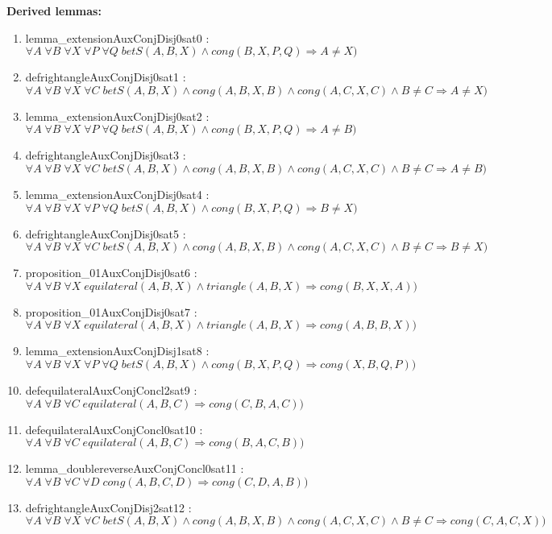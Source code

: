 \documentclass{article}
\begin{document}
\noindent 
{\bfseries Derived lemmas:} 
\begin{enumerate}
\item lemma\_extensionAuxConjDisj0sat0 : $\forall A\;\forall B\;\forall X\;\forall P\;\forall Q\;betS(A, B, X)\wedge cong(B, X, P, Q) \Rightarrow A \neq X)$
\item defrightangleAuxConjDisj0sat1 : $\forall A\;\forall B\;\forall X\;\forall C\;betS(A, B, X)\wedge cong(A, B, X, B)\wedge cong(A, C, X, C)\wedge B \neq C \Rightarrow A \neq X)$
\item lemma\_extensionAuxConjDisj0sat2 : $\forall A\;\forall B\;\forall X\;\forall P\;\forall Q\;betS(A, B, X)\wedge cong(B, X, P, Q) \Rightarrow A \neq B)$
\item defrightangleAuxConjDisj0sat3 : $\forall A\;\forall B\;\forall X\;\forall C\;betS(A, B, X)\wedge cong(A, B, X, B)\wedge cong(A, C, X, C)\wedge B \neq C \Rightarrow A \neq B)$
\item lemma\_extensionAuxConjDisj0sat4 : $\forall A\;\forall B\;\forall X\;\forall P\;\forall Q\;betS(A, B, X)\wedge cong(B, X, P, Q) \Rightarrow B \neq X)$
\item defrightangleAuxConjDisj0sat5 : $\forall A\;\forall B\;\forall X\;\forall C\;betS(A, B, X)\wedge cong(A, B, X, B)\wedge cong(A, C, X, C)\wedge B \neq C \Rightarrow B \neq X)$
\item proposition\_01AuxConjDisj0sat6 : $\forall A\;\forall B\;\forall X\;equilateral(A, B, X)\wedge triangle(A, B, X) \Rightarrow cong(B, X, X, A))$
\item proposition\_01AuxConjDisj0sat7 : $\forall A\;\forall B\;\forall X\;equilateral(A, B, X)\wedge triangle(A, B, X) \Rightarrow cong(A, B, B, X))$
\item lemma\_extensionAuxConjDisj1sat8 : $\forall A\;\forall B\;\forall X\;\forall P\;\forall Q\;betS(A, B, X)\wedge cong(B, X, P, Q) \Rightarrow cong(X, B, Q, P))$
\item defequilateralAuxConjConcl2sat9 : $\forall A\;\forall B\;\forall C\;equilateral(A, B, C) \Rightarrow cong(C, B, A, C))$
\item defequilateralAuxConjConcl0sat10 : $\forall A\;\forall B\;\forall C\;equilateral(A, B, C) \Rightarrow cong(B, A, C, B))$
\item lemma\_doublereverseAuxConjConcl0sat11 : $\forall A\;\forall B\;\forall C\;\forall D\;cong(A, B, C, D) \Rightarrow cong(C, D, A, B))$
\item defrightangleAuxConjDisj2sat12 : $\forall A\;\forall B\;\forall X\;\forall C\;betS(A, B, X)\wedge cong(A, B, X, B)\wedge cong(A, C, X, C)\wedge B \neq C \Rightarrow cong(C, A, C, X))$

\end{enumerate}
\end{document}
